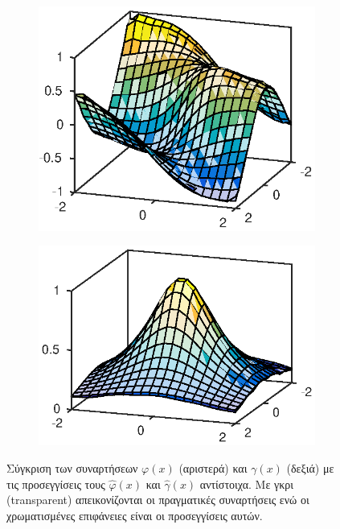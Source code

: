 \begin{figure}
	\begin{subfigure}{0.5\textwidth}
		\includegraphics{plots/experiments/vdp/phi_hat.eps}
	\end{subfigure}
	\begin{subfigure}{0.5\textwidth}
		\includegraphics{plots/experiments/vdp/gamma_hat.eps}
	\end{subfigure}
	\caption{Σύγκριση των συναρτήσεων $\varphi(x)$ (αριστερά) και $\gamma(x)$ (δεξιά) με τις προσεγγίσεις τους $\hat{\varphi}(x)$ και $\hat{\gamma}(x)$ αντίστοιχα. Με γκρι (transparent) απεικονίζονται οι πραγματικές συναρτήσεις ενώ οι χρωματισμένες επιφάνειες είναι οι προσεγγίσεις αυτών. }
	\label{fig:vdp_approximations}
\end{figure}



